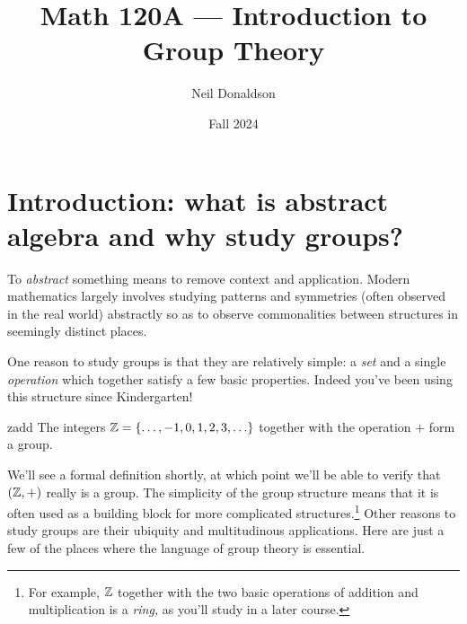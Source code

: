 \graphicspath{{1intro/asy/}}
\thispagestyle{empty}

\title{Math 120A --- Introduction to Group Theory}
\author{Neil Donaldson}
\date{Fall 2024}
\maketitle 


\section{Introduction: what is abstract algebra and why study groups?}\label{chap:intro}

To \emph{abstract} something means to remove context and application. Modern mathematics largely involves studying patterns and symmetries (often observed in the real world) abstractly so as to observe commonalities between structures in seemingly distinct places.\smallbreak

One reason to study groups is that they are relatively simple: a \emph{set} and a single \emph{operation} which together satisfy a few basic properties. Indeed you've been using this structure since Kindergarten!

\begin{example}{}{zadd}
	The integers $\mathbb{Z}=\{\ldots,-1,0,1,2,3,\ldots\}$ together with the operation $+$ form a group.
\end{example}

We'll see a formal definition shortly, at which point we'll be able to verify that $(\mathbb{Z},+)$ really is a group. The simplicity of the group structure means that it is often used as a building block for more complicated structures.\footnote{For example, $\mathbb{Z}$ together with the two basic operations of addition and multiplication is a \emph{ring,} as you'll study in a later course.} Other reasons to study groups are their ubiquity and multitudinous applications. Here are just a few of the places where the language of group theory is essential.

